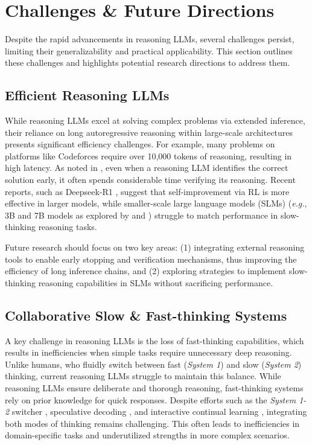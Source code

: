 
\section{Challenges \& Future Directions}\label{future}

Despite the rapid advancements in reasoning LLMs, several challenges persist, limiting their generalizability and practical applicability. 
This section outlines these challenges and highlights potential research directions to address them.

\subsection{Efficient Reasoning LLMs}\label{efficient_srs}

While reasoning LLMs excel at solving complex problems via extended inference, their reliance on long autoregressive reasoning within large-scale architectures presents significant efficiency challenges. 
For example, many problems on platforms like Codeforces require over 10,000 tokens of reasoning, resulting in high latency. 
As noted in \cite{Tecent_2_plus_3}, even when a reasoning LLM identifies the correct solution early, it often spends considerable time verifying its reasoning. 
Recent reports, such as Deepseek-R1 \cite{Deepseek-R1}, suggest that self-improvement via RL is more effective in larger models, while smaller-scale large language models (SLMs) (\emph{e.g.}, 3B and 7B models as explored by \cite{simplerl_reason_blob} and \cite{yeo2025demystifying,tinyzero}) struggle to match performance in slow-thinking reasoning tasks.


Future research should focus on two key areas: (1) integrating external reasoning tools to enable early stopping and verification mechanisms, thus improving the efficiency of long inference chains, and (2) exploring strategies to implement slow-thinking reasoning capabilities in SLMs without sacrificing performance.


\subsection{Collaborative Slow \& Fast-thinking Systems}\label{slow-fast_srs}


A key challenge in reasoning LLMs is the loss of fast-thinking capabilities, which results in inefficiencies when simple tasks require unnecessary deep reasoning. 
Unlike humans, who fluidly switch between fast (\textit{System 1}) and slow (\textit{System 2}) thinking, current reasoning LLMs struggle to maintain this balance. 
While reasoning LLMs ensure deliberate and thorough reasoning, fast-thinking systems rely on prior knowledge for quick responses. 
Despite efforts such as the \textit{System 1-2} switcher \cite{VisualSlowAgent}, speculative decoding \cite{fast_speculative_slow_thinking, ning2023skeleton_of_thought, SpecInfer}, and interactive continual learning \cite{qi2024interactive, litesearch, mix_tree}, integrating both modes of thinking remains challenging. 
This often leads to inefficiencies in domain-specific tasks and underutilized strengths in more complex scenarios.

